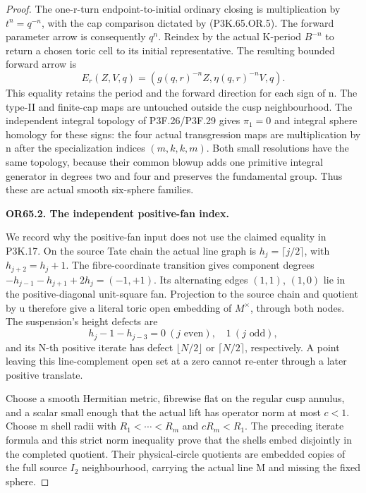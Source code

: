\begin{proof}
The one-r-turn endpoint-to-initial ordinary closing is multiplication
by \(t^n=q^{-n}\), with the cap comparison dictated by (P3K.65.OR.5).
The forward parameter arrow is consequently \(q^n\). Reindex by
the actual K-period \(B^{-n}\) to return a chosen toric cell to
its initial representative. The resulting bounded forward arrow is
\[
 E_r(Z,V,q)=(g(q,r)^{-n}Z,\eta(q,r)^{-n}V,q).          \tag{P3K.65.OR.6}
\]
This equality retains the period and the forward direction for
each sign of n. The type-II and finite-cap maps are untouched
outside the cusp neighbourhood. The independent integral topology
of P3F.26/P3F.29 gives \(\pi_1=0\) and integral sphere homology
for these signs: the four actual transgression maps are
multiplication by n after the specialization indices
\((m,k,k,m)\). Both small resolutions have the same topology,
because their common blowup adds one primitive integral generator
in degrees two and four and preserves the fundamental group.
Thus these are actual smooth six-sphere families.

\par\medskip\noindent\textbf{OR65.2. The independent positive-fan index.}\par\nopagebreak[4]

We record why the positive-fan input does not use the claimed
equality in P3K.17. On the source Tate chain the actual line graph
is \(h_j=\lceil j/2\rceil\), with \(h_{j+2}=h_j+1\).
The fibre-coordinate transition gives component degrees
\(-h_{j-1}-h_{j+1}+2h_j=(-1,+1)\). Its alternating edges
\((1,1)\), \((1,0)\) lie in the positive-diagonal unit-square fan.
Projection to the source chain and quotient by u therefore give a
literal toric open embedding of \(M^\times\), through both nodes.
The suspension's height defects are
\[
 h_j-1-h_{j-3}=0\ (j\text{ even}),\quad1\ (j\text{ odd}),
\]
and its N-th positive iterate has defect
\(\lfloor N/2\rfloor\) or \(\lceil N/2\rceil\), respectively.
A point leaving this line-complement open set at a zero cannot
re-enter through a later positive translate.

Choose a smooth Hermitian metric, fibrewise flat on the regular
cusp annulus, and a scalar small enough that the actual lift has
operator norm at most \(c<1\). Choose m shell radii with
\(R_1<\cdots<R_m\) and \(cR_m<R_1\). The preceding iterate
formula and this strict norm inequality prove that the shells
embed disjointly in the completed quotient. Their physical-circle
quotients are embedded copies of the full source \(I_2\)
neighbourhood, carrying the actual line M and missing the fixed
sphere.


\end{proof}
